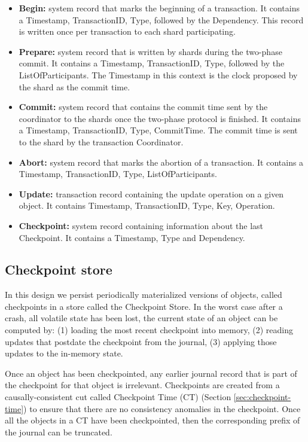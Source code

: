 \documentclass[twoside]{article}
\begin{document}
\begin{itemize}
\item \textbf{Begin:} system record that marks the beginning of a
transaction. 
It contains a Timestamp, TransactionID, Type, followed by the Dependency.
This record is written once per transaction to each shard
participating.
\item \textbf{Prepare:} system record that is written by shards during the two-phase commit. 
It contains a Timestamp, TransactionID, Type, followed by the ListOfParticipants.
The Timestamp in this context is the clock proposed by the shard as the commit time.
\item \textbf{Commit:} system record that contains the commit time sent by the coordinator
to the shards once the two-phase protocol is finished.
It contains a Timestamp, TransactionID, Type, CommitTime.
The commit time is sent to the shard by the transaction Coordinator.
\item \textbf{Abort:} system record that marks the abortion of a transaction.
It contains a Timestamp, TransactionID, Type, ListOfParticipants.
\item \textbf{Update:} transaction record containing the update operation on a given
object.
It contains Timestamp, TransactionID, Type, Key, Operation.
\item \textbf{Checkpoint:} system record containing information about the last Checkpoint.
It contains a Timestamp, Type and Dependency. 
\end{itemize}


\subsection{Checkpoint store}
\label{sec:checkpoint-store}

In this design we persist periodically materialized versions of objects, called
checkpoints in a store called the Checkpoint Store.  
In the worst case after a crash, all volatile state has been lost, the current
state of an object can be computed by: (1) loading the most recent checkpoint
into memory, (2) reading updates that postdate the checkpoint from the journal,
(3) applying those updates to the in-memory state.

Once an object has been checkpointed, any earlier journal record that is part of 
the checkpoint for that object is irrelevant. 
Checkpoints are created from a causally-consistent cut called Checkpoint Time
(CT) (Section \ref{sec:checkpoint-time}) to ensure that there are no consistency
anomalies in the checkpoint.
Once all the objects in a CT have been checkpointed, then the corresponding
prefix of the journal can be truncated. 
\end{document}
